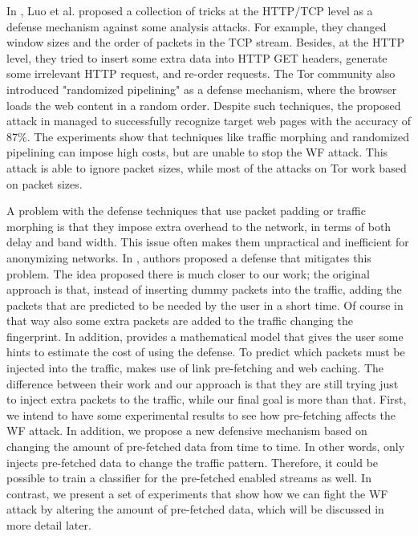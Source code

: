 In \cite{luo2011}, Luo et al. proposed a collection of tricks at the HTTP/TCP level as a defense mechanism against some analysis attacks. For example, they changed window sizes and the order of packets in the TCP stream. Besides, at the HTTP level, they tried to insert some extra data into HTTP GET headers, generate some irrelevant HTTP request, and re-order requests. The Tor community also introduced "randomized pipelining" \cite{perry11} as a defense mechanism, where the browser loads the web content in a random order. Despite such techniques, the proposed attack in \cite{cai2012touching} managed to successfully recognize target web pages with the accuracy of 87\%. The experiments show that techniques like traffic morphing and randomized pipelining can impose high costs, but are unable to stop the WF attack. This attack is able to ignore packet sizes, while most of the attacks on Tor work based on packet sizes.

A problem with the defense techniques that use packet padding or traffic morphing is that they impose extra
 overhead to the network, in terms of both delay and band width. This issue often makes them unpractical and inefficient for anonymizing networks. In \cite{yu10}, authors proposed a defense that mitigates this problem. 
 The idea proposed there is much closer to our work; the original approach is that, instead of inserting dummy packets into the traffic, adding the packets that are predicted to be needed by the user in a short time. Of course in that way also some extra packets are added to the traffic changing the fingerprint. In addition,  \cite{yu10} provides a mathematical model that gives the user some hints to estimate the cost of using the defense. To predict which packets must be injected into the traffic, \cite{yu10}
 makes use of link pre-fetching and web caching. The difference between their work and our approach is that they are still trying just to inject extra packets to the traffic, while our final goal is more than that. First, we intend 
 to have some experimental results to see how pre-fetching affects the WF attack. In addition, we propose a new defensive mechanism based on changing the amount of pre-fetched data from time to time. In other words, \cite{yu10} only injects pre-fetched data to change the traffic pattern. Therefore, it could be possible to train a classifier for the pre-fetched enabled streams as well. In contrast, we present a set of experiments that show how we can fight the WF attack by altering the amount of pre-fetched data, which will be discussed in more detail later.
 
